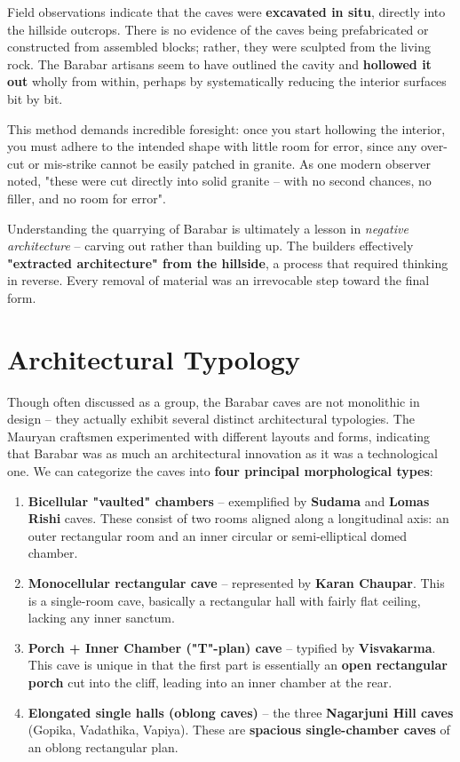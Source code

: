 \documentclass[11pt]{article}
\begin{document}
Field observations indicate that the caves were \textbf{excavated in situ}, directly into the hillside outcrops. There is no evidence of the caves being prefabricated or constructed from assembled blocks; rather, they were sculpted from the living rock. The Barabar artisans seem to have outlined the cavity and \textbf{hollowed it out} wholly from within, perhaps by systematically reducing the interior surfaces bit by bit.

This method demands incredible foresight: once you start hollowing the interior, you must adhere to the intended shape with little room for error, since any over-cut or mis-strike cannot be easily patched in granite. As one modern observer noted, "these were cut directly into solid granite -- with no second chances, no filler, and no room for error".

Understanding the quarrying of Barabar is ultimately a lesson in \textit{negative architecture} -- carving out rather than building up. The builders effectively \textbf{"extracted architecture" from the hillside}, a process that required thinking in reverse. Every removal of material was an irrevocable step toward the final form.

\section{Architectural Typology}

Though often discussed as a group, the Barabar caves are not monolithic in design -- they actually exhibit several distinct architectural typologies. The Mauryan craftsmen experimented with different layouts and forms, indicating that Barabar was as much an architectural innovation as it was a technological one. We can categorize the caves into \textbf{four principal morphological types}:

\begin{enumerate}
\item \textbf{Bicellular "vaulted" chambers} -- exemplified by \textbf{Sudama} and \textbf{Lomas Rishi} caves. These consist of two rooms aligned along a longitudinal axis: an outer rectangular room and an inner circular or semi-elliptical domed chamber.

\item \textbf{Monocellular rectangular cave} -- represented by \textbf{Karan Chaupar}. This is a single-room cave, basically a rectangular hall with fairly flat ceiling, lacking any inner sanctum.

\item \textbf{Porch + Inner Chamber ("T"-plan) cave} -- typified by \textbf{Visvakarma}. This cave is unique in that the first part is essentially an \textbf{open rectangular porch} cut into the cliff, leading into an inner chamber at the rear.

\item \textbf{Elongated single halls (oblong caves)} -- the three \textbf{Nagarjuni Hill caves} (Gopika, Vadathika, Vapiya). These are \textbf{spacious single-chamber caves} of an oblong rectangular plan.
\end{enumerate}
\end{document}
